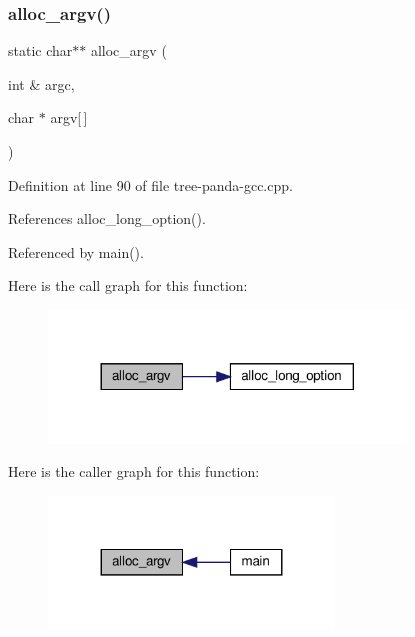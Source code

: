 \subsubsection{\texorpdfstring{alloc\+\_\+argv()}{alloc\_argv()}}
{\footnotesize\ttfamily static char$\ast$$\ast$ alloc\+\_\+argv (\begin{DoxyParamCaption}\item[{int \&}]{argc,  }\item[{char $\ast$}]{argv\mbox{[}$\,$\mbox{]} }\end{DoxyParamCaption})\hspace{0.3cm}{\ttfamily [static]}}



Definition at line 90 of file tree-\/panda-\/gcc.\+cpp.



References alloc\+\_\+long\+\_\+option().



Referenced by main().

Here is the call graph for this function\+:
\nopagebreak
\begin{figure}[H]
\begin{center}
\leavevmode
\includegraphics[width=269pt]{d5/d39/tree-panda-gcc_8cpp_a36fa77da144f4db9e21e7f1111f36689_cgraph}
\end{center}
\end{figure}
Here is the caller graph for this function\+:
\nopagebreak
\begin{figure}[H]
\begin{center}
\leavevmode
\includegraphics[width=215pt]{d5/d39/tree-panda-gcc_8cpp_a36fa77da144f4db9e21e7f1111f36689_icgraph}
\end{center}
\end{figure}
\mbox{\label{tree-panda-gcc_8cpp_a21e223ecfa9ab60866ce6eebfcf51564}} 
